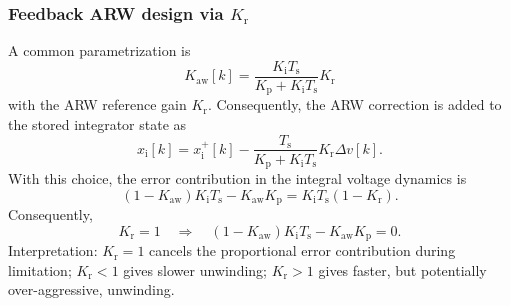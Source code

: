 \begin{frame}
    \frametitle{Feedback ARW design via $K_{\mathrm{r}}$}
    A common parametrization is
    \begin{equation}
        K_{\mathrm{aw}}[k]
        =
        \frac{K_{\mathrm{i}}T_{\mathrm{s}}}{K_{\mathrm{p}}+K_{\mathrm{i}}T_{\mathrm{s}}}
        K_{\mathrm{r}}
        \label{eq:arw_kr_definition}
    \end{equation}
    with the ARW reference gain $K_{\mathrm{r}}$. \pause Consequently, the ARW correction is added to the stored integrator state as
    \begin{equation}
        x_{\mathrm{i}}[k]
        =
        x^+_{\mathrm{i}}[k]
        -
        \frac{T_\mathrm{s}}{K_\mathrm{p}+K_\mathrm{i}T_\mathrm{s}}K_\mathrm{r}\Delta v[k].
        \label{eq:arw_kr_state_update}
    \end{equation}\pause%
    With this choice, the error contribution in the integral voltage dynamics is
    \begin{equation}
        (1-K_{\mathrm{aw}})K_{\mathrm{i}}T_{\mathrm{s}}
        -
        K_{\mathrm{aw}}K_{\mathrm{p}}
        =
        K_{\mathrm{i}}T_{\mathrm{s}}\left(1-K_{\mathrm{r}}\right).
        \label{eq:arw_kr_error_contribution}
    \end{equation}\pause%
    Consequently,
    \begin{equation}
        K_{\mathrm{r}}=1
        \quad\Longrightarrow\quad
        (1-K_{\mathrm{aw}})K_{\mathrm{i}}T_{\mathrm{s}}
        -
        K_{\mathrm{aw}}K_{\mathrm{p}}
        =
        0.
        \label{eq:arw_kr_one}
    \end{equation}\pause%
    Interpretation: $K_{\mathrm{r}}=1$ cancels the proportional error contribution during
    limitation; $K_{\mathrm{r}}<1$ gives slower unwinding; $K_{\mathrm{r}}>1$ gives faster,
    but potentially over-aggressive, unwinding.
\end{frame}

